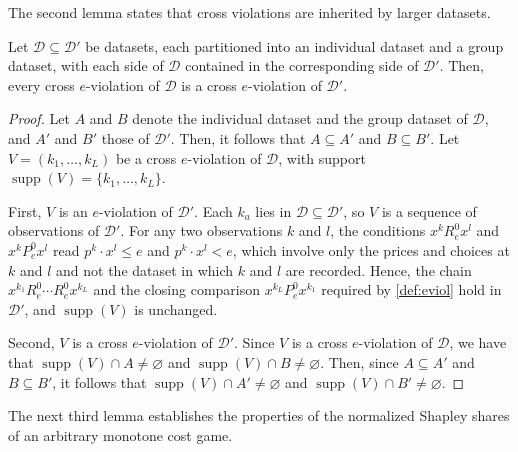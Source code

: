 \documentclass[11 pt]{article}
\begin{document}
The second lemma states that cross violations are inherited by larger datasets.

\begin{lemma}\label{lem:app_transfer}
Let $\mathcal{D} \subseteq \mathcal{D}'$ be datasets, each partitioned into an individual dataset and a group dataset, with each side of $\mathcal{D}$ contained in the corresponding side of $\mathcal{D}'$. Then, every cross $e$-violation of $\mathcal{D}$ is a cross $e$-violation of $\mathcal{D}'$.
\end{lemma}

\begin{proof}
Let $A$ and $B$ denote the individual dataset and the group dataset of $\mathcal{D}$, and $A'$ and $B'$ those of $\mathcal{D}'$. Then, it follows that $A \subseteq A'$ and $B \subseteq B'$. Let $V = (k_{1}, \dots, k_{L})$ be a cross $e$-violation of $\mathcal{D}$, with support $\operatorname{supp}(V) = \{ k_{1}, \dots, k_{L} \}$. 

First, $V$ is an $e$-violation of $\mathcal{D}'$. Each $k_{a}$ lies in $\mathcal{D} \subseteq \mathcal{D}'$, so $V$ is a sequence of observations of $\mathcal{D}'$. For any two observations $k$ and $l$, the conditions $x^{k} \mathrel{R^{0}_{e}} x^{l}$ and $x^{k} \mathrel{P^{0}_{e}} x^{l}$ read $p^{k} \cdot x^{l} \leq e$ and $p^{k} \cdot x^{l} < e$, which involve only the prices and choices at $k$ and $l$ and not the dataset in which $k$ and $l$ are recorded. Hence, the chain $x^{k_{1}} \mathrel{R^{0}_{e}} \cdots \mathrel{R^{0}_{e}} x^{k_{L}}$ and the closing comparison $x^{k_{L}} \mathrel{P^{0}_{e}} x^{k_{1}}$ required by \autoref{def:eviol} hold in $\mathcal{D}'$, and $\operatorname{supp}(V)$ is unchanged.

Second, $V$ is a cross $e$-violation of $\mathcal{D}'$. Since $V$ is a cross $e$-violation of $\mathcal{D}$, we have that $\operatorname{supp}(V) \cap A \neq \varnothing$ and $\operatorname{supp}(V) \cap B \neq \varnothing$. Then, since $A \subseteq A'$ and $B \subseteq B'$, it follows that $\operatorname{supp}(V) \cap A' \neq \varnothing$ and $\operatorname{supp}(V) \cap B' \neq \varnothing$.
\end{proof}

The next third lemma establishes the properties of the normalized Shapley shares of an arbitrary monotone cost game.
\end{document}
